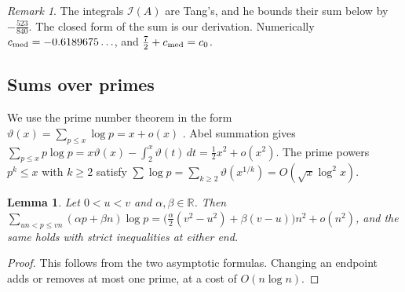\documentclass[11pt]{amsart}
\newtheorem{lemma}[theorem]{Lemma}
\theoremstyle{definition}
\theoremstyle{remark}
\newtheorem{remark}[theorem]{Remark}
\numberwithin{equation}{section}
\newcommand{\R}{\mathbb R}
\begin{document}
\begin{remark}
The integrals $\mathcal I(A)$ are Tang's, and he bounds their sum below by $-\frac{523}{840}$. The closed form of the
sum is our derivation. Numerically $c_{\rm med}=-0.6189675\ldots$, and $\frac72+c_{\rm med}=c_0$.
\end{remark}

\subsection{Sums over primes}\label{tp:ssec:sums}
We use the prime number theorem in the form $\vartheta(x)=\sum_{p\le x}\log p=x+o(x)$ \cite{Davenport}. Abel summation
gives $\sum_{p\le x}p\log p=x\vartheta(x)-\int_2^x\vartheta(t)\,dt=\frac12x^2+o(x^2)$. The prime powers $p^k\le x$ with $k\ge2$ satisfy $\sum\log p=\sum_{k\ge2}\vartheta(x^{1/k})=O(\sqrt x\log^2x)$.

\begin{lemma}\label{tp:lem:pnt}
Let $0<u<v$ and $\alpha,\beta\in\R$. Then
$\sum_{un<p\le vn}(\alpha p+\beta n)\log p=\bigl(\frac\alpha2(v^2-u^2)+\beta(v-u)\bigr)n^2+o(n^2)$, and the same holds
with strict inequalities at either end.
\end{lemma}

\begin{proof}
This follows from the two asymptotic formulas. Changing an endpoint adds or removes at most one prime, at a cost of
$O(n\log n)$.
\end{proof}
\end{document}
